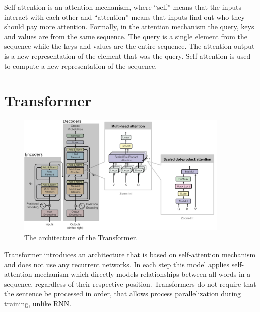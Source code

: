 Self-attention is an attention mechanism, where ``self'' means that the inputs interact with each other and ``attention'' means that inputs find out who they should pay more attention. Formally, in the attention mechanism the query, keys and values are from the same sequence. The query is a single element from the sequence while the keys and values are the entire sequence. The attention output is a new representation of the element that was the query. Self-attention is used to compute a new representation of the sequence.  

\section{Transformer} \label{sec_transformer}

\begin{figure}[hbt]
  \centering
  \includegraphics[width=0.9\textwidth]{figures/transformer_attention.pdf}
  \caption[Transformer architecture]{The architecture of the Transformer.\protect\footnotemark}
  \label{fig:transformer}
\end{figure}



Transformer \cite{vaswani2017attention} introduces an architecture that is based on self-attention mechanism and does not use any recurrent networks. In each step this model applies self-attention mechanism which directly models relationships between all words in a sequence, regardless of their respective position. Transformers do not require that the sentence be processed in order, that allows process parallelization during training, unlike RNN. 

